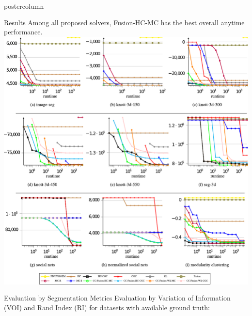 \documentclass[final,hyperref={pdfpagelabels=false}]{beamer}
\begin{document}
\begin{frame}
\begin{columns}
\begin{column}{.49\textwidth}
\begin{beamercolorbox}[center,wd=\textwidth]{postercolumn}
\begin{minipage}[T]{.95\textwidth}
{            \begin{block}{Results}
            \small{
            Among all proposed solvers, Fusion-HC-MC has the best overall anytime performance.
            }
            \includegraphics[width=0.9\linewidth]{res_images.pdf}


            \end{block}
            \vfill
            \begin{block}{Evaluation by Segmentation Metrics}
                \small{
                Evaluation by Variation of Information (VOI) and
                Rand Index (RI) for datasets with available ground truth:
                }
                \vspace{1cm}



\end{block}}
\end{minipage}
\end{beamercolorbox}
\end{column}
\end{columns}
\end{frame}
\end{document}
